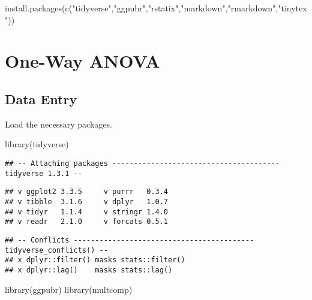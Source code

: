 \documentclass[
]{book}
\newenvironment{Shaded}{\begin{snugshade}}{\end{snugshade}}
\newcommand{\FunctionTok}[1]{\textcolor[rgb]{0.00,0.00,0.00}{#1}}
\newcommand{\NormalTok}[1]{#1}
\newcommand{\StringTok}[1]{\textcolor[rgb]{0.31,0.60,0.02}{#1}}
\begin{document}
\begin{Shaded}
\begin{Highlighting}[]
\FunctionTok{install.packages}\NormalTok{(}\FunctionTok{c}\NormalTok{(}\StringTok{"tidyverse"}\NormalTok{,}\StringTok{"ggpubr"}\NormalTok{,}\StringTok{"rstatix"}\NormalTok{,}\StringTok{"markdown"}\NormalTok{,}\StringTok{"rmarkdown"}\NormalTok{,}\StringTok{"tinytex"}\NormalTok{))}
\end{Highlighting}
\end{Shaded}

\hypertarget{part-one-way-anova}{%
\part*{One-Way ANOVA}\label{part-one-way-anova}}

\hypertarget{data-entry}{%
\chapter{Data Entry}\label{data-entry}}

Load the necessary packages.

\begin{Shaded}
\begin{Highlighting}[]
\FunctionTok{library}\NormalTok{(tidyverse)}
\end{Highlighting}
\end{Shaded}

\begin{verbatim}
## -- Attaching packages --------------------------------------- tidyverse 1.3.1 --
\end{verbatim}

\begin{verbatim}
## v ggplot2 3.3.5     v purrr   0.3.4
## v tibble  3.1.6     v dplyr   1.0.7
## v tidyr   1.1.4     v stringr 1.4.0
## v readr   2.1.0     v forcats 0.5.1
\end{verbatim}

\begin{verbatim}
## -- Conflicts ------------------------------------------ tidyverse_conflicts() --
## x dplyr::filter() masks stats::filter()
## x dplyr::lag()    masks stats::lag()
\end{verbatim}

\begin{Shaded}
\begin{Highlighting}[]
\FunctionTok{library}\NormalTok{(ggpubr)}
\FunctionTok{library}\NormalTok{(multcomp)}
\end{Highlighting}
\end{Shaded}
\end{document}
